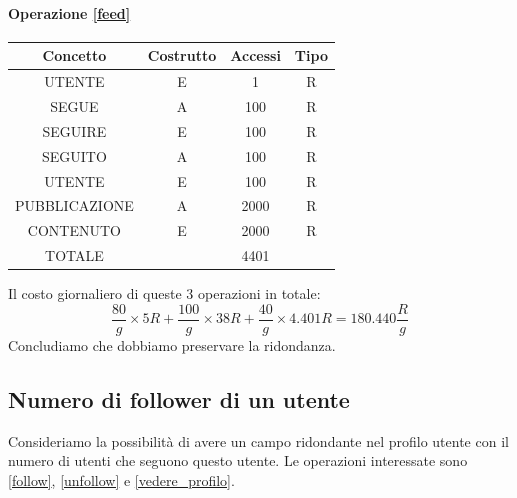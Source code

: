 \documentclass[a4paper,12pt]{report}
\begin{document}
\begin{table}[H]
\paragraph{Operazione \ref{feed}\newline}
\begin{tabular}{|c|c|c|c|}
\hline
Concetto      & Costrutto & Accessi & Tipo \\ \hline
UTENTE        & E         & 1       & R    \\ \hline
SEGUE         & A         & 100     & R    \\ \hline
SEGUIRE       & E         & 100     & R    \\ \hline
SEGUITO       & A         & 100     & R    \\ \hline
UTENTE        & E         & 100     & R    \\ \hline
PUBBLICAZIONE & A         & 2000    & R    \\ \hline
CONTENUTO     & E         & 2000    & R    \\ \hline
TOTALE        &           & 4401    &      \\ \hline
\end{tabular}
\end{table}
Il costo giornaliero di queste 3 operazioni in totale:
\begin{equation}
  \frac{80} g \times 5 R + \frac{100} g \times 38 R + \frac{40} g \times 4.401 R = 180.440 \frac{R} g 
\end{equation}
Concludiamo che dobbiamo preservare la ridondanza.

\subsection{Numero di follower di un utente}
Consideriamo la possibilità di avere un campo ridondante nel profilo utente con il numero di utenti che seguono questo utente. Le operazioni interessate sono \ref{follow}, \ref{unfollow} e \ref{vedere_profilo}.
\end{document}

